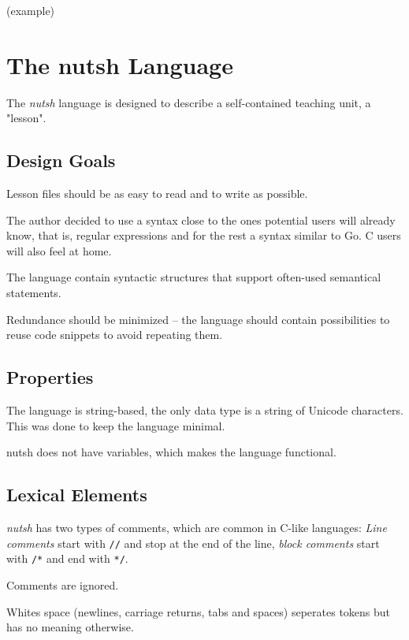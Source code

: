 \documentclass[a4paper,twoside,abstract=on,cleardoublepage=empty,numbers=noenddot,toc=bib]{scrreprt}
\begin{document}

(example)

\chapter{The nutsh Language}

The \emph{nutsh} language is designed to describe a self-contained teaching unit, a "lesson".

\section{Design Goals}

Lesson files should be as easy to read and to write as possible.

The author decided to use a syntax close to the ones potential users will already know, that is, regular expressions and for the rest a syntax similar to Go. C users will also feel at home.

The language contain syntactic structures that support often-used semantical statements.

Redundance should be minimized -- the language should contain possibilities to reuse code snippets to avoid repeating them.

\section{Properties}

The language is string-based, the only data type is a string of Unicode characters. This was done to keep the language minimal.

nutsh does not have variables, which makes the language functional.

\section{Lexical Elements}


\emph{nutsh} has two types of comments, which are common in C-like languages: \emph{Line comments} start with \texttt{//} and stop at the end of the line, \emph{block comments} start with \texttt{/*} and end with \texttt{*/}.

Comments are ignored.


Whites space (newlines, carriage returns, tabs and spaces) seperates tokens but has no meaning otherwise.
\end{document}
